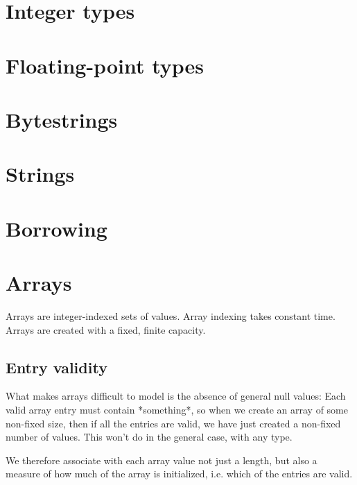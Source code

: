 \documentclass[a4paper]{book}
\begin{document}
\chapter{Integer types}
\chapter{Floating-point types}
\chapter{Bytestrings}





\chapter{Strings}
\chapter{Borrowing}


\chapter{Arrays}

Arrays are integer-indexed sets of values.
Array indexing takes constant time.
Arrays are created with a fixed, finite capacity.

\section{Entry validity}

What makes arrays difficult to model is the absence of general null values:
Each valid array entry must contain *something*, so when we create an
array of some non-fixed size, then if all the entries are valid, we
have just created a non-fixed number of values.
This won't do in the general case, with any type.

We therefore associate with each array value not just a length, but
also a measure of how much of the array is initialized, i.e. which of
the entries are valid.
\end{document}
